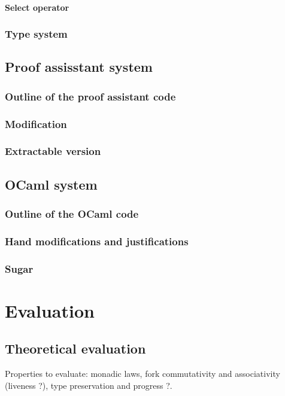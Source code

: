\documentclass[12pt,twoside,notitlepage]{report}
\begin{document}
\subsubsection{Select operator}
\subsection{Type system}
\section{Proof assisstant system}
\subsection{Outline of the proof assistant code}
\subsection{Modification}
\subsection{Extractable version}
\section{OCaml system}
\subsection{Outline of the OCaml code}
\subsection{Hand modifications and justifications}
\subsection{Sugar}



\cleardoublepage
\chapter{Evaluation}

\section{Theoretical evaluation}
Properties to evaluate: monadic laws, fork commutativity and associativity (liveness ?), type preservation and progress ?.
\end{document}
